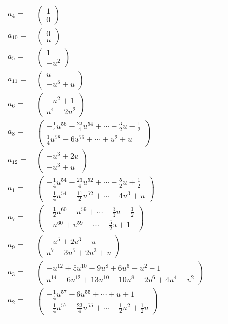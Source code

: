 \documentclass[1p]{elsarticle_modified}
\theoremstyle{definition}
\begin{document}
\begin{tabular}{m{7pt} m{180pt} m{7pt} m{180pt} }
\flushright $a_{4}=$&$\begin{pmatrix}1\\0\end{pmatrix}$ \\
\flushright $a_{10}=$&$\begin{pmatrix}0\\u\end{pmatrix}$ \\
\flushright $a_{5}=$&$\begin{pmatrix}1\\- u^2\end{pmatrix}$ \\
\flushright $a_{11}=$&$\begin{pmatrix}u\\- u^3+u\end{pmatrix}$ \\
\flushright $a_{6}=$&$\begin{pmatrix}- u^2+1\\u^4-2 u^2\end{pmatrix}$ \\
\flushright $a_{8}=$&$\begin{pmatrix}-\frac{1}{4} u^{56}+\frac{23}{4} u^{54}+\cdots-\frac{3}{2} u-\frac{1}{2}\\\frac{1}{4} u^{58}-6 u^{56}+\cdots+u^2+u\end{pmatrix}$ \\
\flushright $a_{12}=$&$\begin{pmatrix}- u^3+2 u\\- u^3+u\end{pmatrix}$ \\
\flushright $a_{1}=$&$\begin{pmatrix}-\frac{1}{4} u^{54}+\frac{23}{4} u^{52}+\cdots+\frac{5}{2} u+\frac{1}{2}\\-\frac{1}{4} u^{54}+\frac{11}{2} u^{52}+\cdots-4 u^3+u\end{pmatrix}$ \\
\flushright $a_{7}=$&$\begin{pmatrix}-\frac{1}{2} u^{60}+u^{59}+\cdots-\frac{3}{2} u-\frac{1}{2}\\- u^{60}+u^{59}+\cdots+\frac{5}{2} u+1\end{pmatrix}$ \\
\flushright $a_{9}=$&$\begin{pmatrix}- u^5+2 u^3- u\\u^7-3 u^5+2 u^3+u\end{pmatrix}$ \\
\flushright $a_{3}=$&$\begin{pmatrix}- u^{12}+5 u^{10}-9 u^8+6 u^6- u^2+1\\u^{14}-6 u^{12}+13 u^{10}-10 u^8-2 u^6+4 u^4+u^2\end{pmatrix}$ \\
\flushright $a_{2}=$&$\begin{pmatrix}-\frac{1}{4} u^{57}+6 u^{55}+\cdots+u+1\\-\frac{1}{4} u^{57}+\frac{23}{4} u^{55}+\cdots+\frac{1}{2} u^2+\frac{1}{2} u\end{pmatrix}$\\&\end{tabular}
\end{document}
